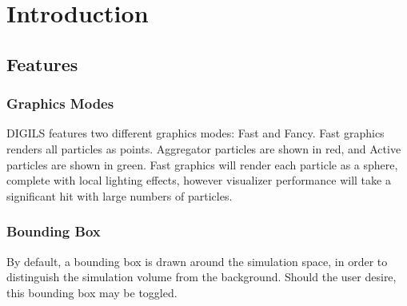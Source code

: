 \documentclass[fleqn,10pt]{SelfArx} %
\begin{document}
\flushbottom %

\maketitle %

\tableofcontents %

\thispagestyle{empty} %


\section*{Introduction} %



\subsection{Features}

\subsubsection{Graphics Modes}
DIGILS features two different graphics modes: Fast and Fancy. Fast graphics renders all particles as points. Aggregator particles are shown in red, and Active particles are shown in green. Fast graphics will render each particle as a sphere, complete with local lighting effects, however visualizer performance will take a significant hit with large numbers of particles.
\subsubsection{Bounding Box}
By default, a bounding box is drawn around the simulation space, in order to distinguish the simulation volume from the background. Should the user desire, this bounding box may be toggled.
\end{document}
